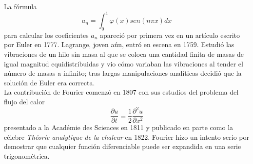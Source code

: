 \documentclass[a4paper,12pt]{article}
\begin{document}
\indent La fórmula
\[ a_n = \int_0^1 \varphi(x)sen\left(n\pi x\right)dx \]
para calcular los coeficientes $a_n$ apareció por primera vez en un artículo escrito por Euler en 1777.
\indent Lagrange, joven aún, entró en escena en 1759. Estudió las vibraciones de un hilo sin masa al que se coloca una cantidad finita de masas de igual magnitud equidistribuidas y vio cómo variaban las vibraciones al tender el
número de masas a infinito; tras largas manipulaciones analíticas decidió que la solución de Euler era correcta.\\
\indent La contribución de Fourier comenzó en 1807 con sus estudios del problema
del flujo del calor
\[ \frac{\partial u}{\partial t} = \frac{1}{2}\frac{\partial^2u}{\partial x^2} \]
presentado a la Académie des Sciences en 1811 y publicado en parte como la célebre \textit{Théorie analytique de la chaleur} en 1822. Fourier hizo un intento serio por demostrar que cualquier función diferenciable puede ser expandida
en una serie trigonométrica.
\end{document}
